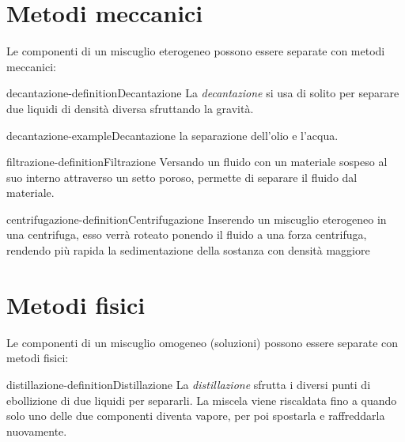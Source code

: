 \documentclass[preview]{standalone}
\begin{document}
\genpage

\section{Metodi meccanici}

\begin{plainhtml}
    Le componenti di un miscuglio eterogeneo possono essere separate con metodi meccanici:
\end{plainhtml}

\begin{snippetdefinition}{decantazione-definition}{Decantazione}
    La \textit{decantazione} si usa di solito per separare due liquidi di densità diversa
    sfruttando la gravità.
\end{snippetdefinition}

\begin{snippetexample}{decantazione-example}{Decantazione}
    la separazione dell'olio e l'acqua.
\end{snippetexample}

\begin{snippetdefinition}{filtrazione-definition}{Filtrazione}
    Versando un fluido con un materiale sospeso al suo interno attraverso un setto poroso,
    permette di separare il fluido dal materiale.
\end{snippetdefinition}

\begin{snippetdefinition}{centrifugazione-definition}{Centrifugazione}
    Inserendo un miscuglio eterogeneo in una centrifuga, esso verrà roteato ponendo il
    fluido a una forza centrifuga, rendendo più rapida la sedimentazione della sostanza con densità maggiore
\end{snippetdefinition}

\section{Metodi fisici}

\begin{plainhtml}
    Le componenti di un miscuglio omogeneo (soluzioni) possono essere separate con metodi fisici:
\end{plainhtml}

\begin{snippetdefinition}{distillazione-definition}{Distillazione}
    La \textit{distillazione} sfrutta i diversi punti di ebollizione di due liquidi per separarli.
    La miscela viene riscaldata fino a quando solo uno delle due componenti diventa vapore, per poi
    spostarla e raffreddarla nuovamente.
\end{snippetdefinition}
\end{document}
